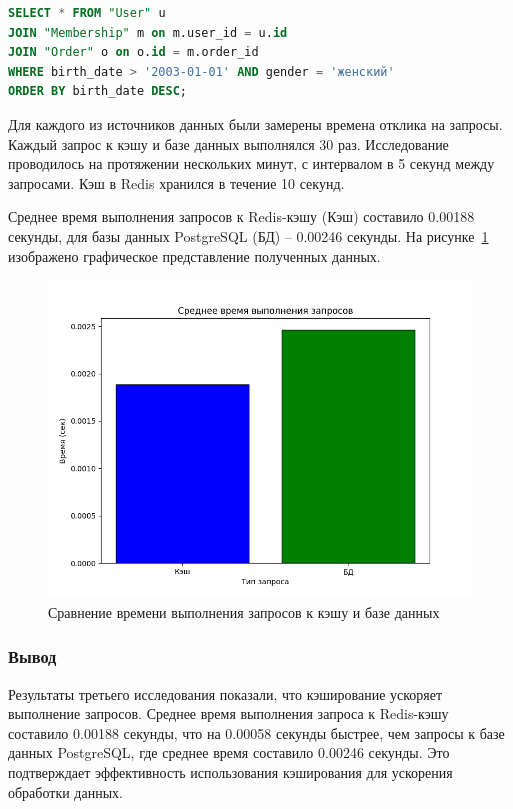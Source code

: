 \begin{lstlisting}[language=SQL,
	label=lst:select_redis,
	caption={Извлечение данных о пользователях женского пола, рождённых после 1 января 2003 г., с сортировкой по дате рождения},
	captionpos=t,
	basicstyle=\ttfamily\small]
SELECT * FROM "User" u
JOIN "Membership" m on m.user_id = u.id
JOIN "Order" o on o.id = m.order_id
WHERE birth_date > '2003-01-01' AND gender = 'женский'
ORDER BY birth_date DESC;
\end{lstlisting}

Для каждого из источников данных были замерены времена отклика на запросы. Каждый запрос к кэшу и базе данных выполнялся 30 раз. Исследование проводилось на протяжении нескольких минут, с интервалом в 5 секунд между запросами. Кэш в Redis хранился в течение 10 секунд.

Среднее время выполнения запросов к Redis-кэшу (Кэш) составило 0.00188 секунды, для базы данных PostgreSQL (БД) -- 0.00246 секунды. На рисунке~\ref{fig:dr3} изображено графическое представление полученных данных. 

\begin{figure}[ht!]
	\begin{center}
		\includegraphics[scale=0.7]{./img/just.png}
	\end{center}
	\caption{Сравнение времени выполнения запросов к кэшу и базе данных}
	\label{fig:dr3}
\end{figure}


\subsubsection*{\normalsize Вывод}

Результаты третьего исследования показали, что кэширование ускоряет выполнение запросов. Среднее время выполнения запроса к Redis-кэшу составило 0.00188 секунды, что на 0.00058 секунды быстрее, чем запросы к базе данных PostgreSQL, где среднее время составило 0.00246 секунды. Это подтверждает эффективность использования кэширования для ускорения обработки данных.